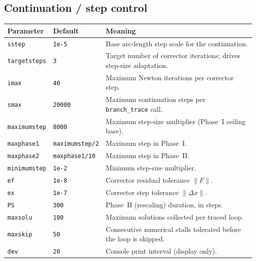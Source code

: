 \documentclass[11pt,a4paper]{article}
\newcommand{\code}[1]{\texttt{#1}}
\begin{document}
\subsection{Continuation / step control}
\begin{center}\small
\begin{longtable}{@{}p{}p{}p{}@{}}
\toprule
\textbf{Parameter} & \textbf{Default} & \textbf{Meaning}\\
\midrule\endhead
\code{sstep}        & \code{1e-5} & Base arc-length step scale for the continuation.\\
\code{targetsteps}  & \code{3}    & Target number of corrector iterations; drives step-size adaptation.\\
\code{imax}         & \code{40}   & Maximum Newton iterations per corrector step.\\
\code{smax}         & \code{20000}& Maximum continuation steps per \code{branch_trace} call.\\
\code{maximumstep}  & \code{8000} & Maximum step-size multiplier (Phase~I ceiling base).\\
\code{maxphase1}    & \code{maximumstep/2} & Maximum step in Phase~I.\\
\code{maxphase2}    & \code{maxphase1/10}  & Maximum step in Phase~II.\\
\code{minimumstep}  & \code{1e-2} & Minimum step-size multiplier.\\
\code{ef}           & \code{1e-8} & Corrector residual tolerance $\lVert F\rVert$.\\
\code{ex}           & \code{1e-7} & Corrector step tolerance $\lVert \Delta x\rVert$.\\
\code{PS}           & \code{300}  & Phase~II (rescaling) duration, in steps.\\
\code{maxsolu}      & \code{100}  & Maximum solutions collected per traced loop.\\
\code{maxskip}      & \code{50}   & Consecutive numerical stalls tolerated before the loop is skipped.\\
\code{dev}          & \code{20}   & Console print interval (display only).\\
\bottomrule
\end{longtable}
\end{center}
\end{document}
